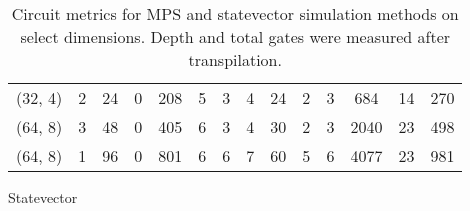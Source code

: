 \begin{table*}
\begin{subtable}{\textwidth}
{\begin{tabular}{|l|c||c|c|c|c|c|c|c|c||c|c|c|c|}
         (32, 4) &          2 &  24 &  0 & 208 & 5 & 3 &  4 & 24 &  2 &                 3 &   684 &     14 &         270 \\
         (64, 8) &          3 &  48 &  0 & 405 & 6 & 3 &  4 & 30 &  2 &                 3 &  2040 &     23 &         498 \\
         (64, 8) &          1 &  96 &  0 & 801 & 6 & 6 &  7 & 60 &  5 &                 6 &  4077 &     23 &         981 \\
          \hline
        \end{tabular}}
      \caption{Statevector}
      \label{table:circuit_metrics_statevector_cpu}
    \end{subtable}
    \caption{Circuit metrics for MPS and statevector simulation methods on
    select dimensions. Depth and total gates were measured after transpilation.}
    \label{table:circuit_metrics}
  \end{table*}
